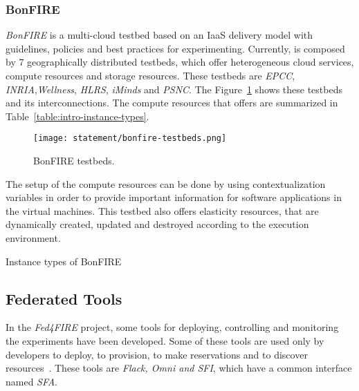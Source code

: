 \subsubsection{BonFIRE}

\emph{BonFIRE} is a multi-cloud testbed based on an \ac{IaaS}
delivery model with guidelines, policies and best practices for
experimenting. Currently, \bonfire is composed by 7 geographically distributed
testbeds, which offer heterogeneous cloud services, compute resources and
storage resources. These testbeds are \emph{EPCC},\emph{
  INRIA},\emph{Wellness},\emph{ HLRS}, \emph{iMinds} and \emph{PSNC}. The
Figure~\ref{fig:intr-bonfire-testbeds} shows these testbeds and its
interconnections. The compute resources that \bonfire offers are summarized in Table~\ref{table:intro-instance-types}.


\begin{figure}[!h]
\begin{center}
\texttt{[image: statement/bonfire-testbeds.png]}
\caption{BonFIRE testbeds.}
\label{fig:intr-bonfire-testbeds}
\end{center}
\end{figure}

The setup of the compute resources can be done by using contextualization variables in
order to provide important information for software applications in the virtual
machines.
This testbed also offers elasticity resources, that are dynamically created,
updated and destroyed according to the execution environment.

\begin{table}[H]
  \centering
  {\small
  
  }
  \caption{Instance types of BonFIRE}
  \label{table:intro-instance-types}
\end{table}


\subsection{Federated Tools}
\label{subsec:federatedtools}
In the \emph{Fed4FIRE} project, some tools for deploying, controlling and
monitoring the experiments have been developed.
Some of these tools are used only by developers to deploy, to provision, to
make reservations and to discover resources~\cite{FED4FIRETOOLS}. These tools are \emph{Flack, Omni
  and SFI}, which have a common interface named \emph{SFA}.

